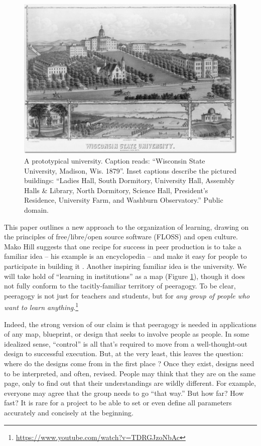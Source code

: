 \begin{figure}
\vspace{-.2cm}
\begin{center}
\includegraphics[width=.5\textwidth,trim=0 30 10 2, clip=true]{wisconsin-map}
\end{center}
\vspace{-.1cm}
\caption{A prototypical university.  Caption reads: ``Wisconsin State
  University, Madison, Wis. 1879''.  Inset captions describe the
  pictured buildings: ``Ladies Hall, South Dormitory, University Hall,
  Assembly Halls \& Library, North Dormitory, Science Hall, President's
  Residence, University Farm, and Washburn Observatory.''  Public
  domain.\label{madison-map}}
\vspace{-.3cm}
\end{figure} 

This paper outlines a new approach to the organization of learning, drawing on the principles of free/libre/open source software (FLOSS) and open culture.  Mako Hill suggests that one recipe for success in peer production is to take a familiar idea -- his example is an encyclopedia -- and make it easy for people to participate in building it \cite[Chapter 1]{mako-thesis}.  Another inspiring familiar idea is the university.  We will take hold of ``learning in institutions'' as a map (Figure \ref{madison-map}), though it does not fully conform to the tacitly-familiar territory of peeragogy.  To be clear, peeragogy is not just for teachers and students, but for \emph{any group of people who want to learn anything}.\footnote{\url{https://www.youtube.com/watch?v=TDRGJzoNbAc}}

Indeed, the strong version of our claim is that peeragogy is needed in applications of any map, blueprint, or design that seeks to involve people as people.  In some idealized sense, ``control'' is all that's required to move from a well-thought-out design to successful execution.  But, at the very least, this leaves the question: where do the designs come from in the first place \cite{von2003cybernetics}?
%
Once they exist, designs need to be interpreted, and often, revised.  People may think that they are on the same page, only to find out that their understandings are wildly different.  For  example, everyone may agree that the group needs to go ``that way.''  But how far?  How fast?  It is rare for a project to be able to set or even define all parameters accurately and concisely at the beginning.

